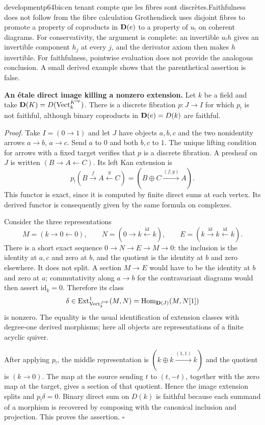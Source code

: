 \begin{dcomment}{development}{p64bis:en tenant compte que les fibres sont discrètes.}{Faithfulness does not follow from the fibre calculation}
Grothendieck uses disjoint fibres to promote a property of coproducts in $\mathbf{D}(e)$ to a property of $u_!$ on coherent diagrams. For conservativity, the argument is complete: an invertible $u_!h$ gives an invertible component $h_j$ at every $j$, and the derivator axiom then makes $h$ invertible. For faithfulness, pointwise evaluation does not provide the analogous conclusion. A small derived example shows that the parenthetical assertion is false.

\textbf{An étale direct image killing a nonzero extension.}\ours{}
Let $k$ be a field and take $\mathbf{D}(K)=D(\operatorname{Vect}_k^{K^{\mathrm{op}}})$. There is a discrete fibration $p:J\to I$ for which $p_!$ is not faithful, although binary coproducts in $\mathbf{D}(e)=D(k)$ are faithful.

\emph{Proof.} Take $I=(0\to1)$ and let $J$ have objects $a,b,c$ and the two nonidentity arrows $a\to b$, $a\to c$. Send $a$ to $0$ and both $b,c$ to $1$. The unique lifting condition for arrows with a fixed target verifies that $p$ is a discrete fibration. A presheaf on $J$ is written $(B\to A\leftarrow C)$. Its left Kan extension is
\[
       p_!(B\xrightarrow{f}A\xleftarrow{g}C)
       =(B\oplus C\xrightarrow{(f,g)}A).
\]
This functor is exact, since it is computed by finite direct sums at each vertex. Its derived functor is consequently given by the same formula on complexes.

Consider the three representations
\[
 M=(k\to0\leftarrow0),\qquad
 N=(0\to k\xleftarrow{\mathrm{id}}k),\qquad
 E=(k\xrightarrow{\mathrm{id}}k\xleftarrow{\mathrm{id}}k).
\]
There is a short exact sequence $0\to N\to E\to M\to0$: the inclusion is the identity at $a,c$ and zero at $b$, and the quotient is the identity at $b$ and zero elsewhere. It does not split. A section $M\to E$ would have to be the identity at $b$ and zero at $a$; commutativity along $a\to b$ for the contravariant diagrams would then assert $\mathrm{id}_k=0$. Therefore its class
\[
       \delta\in\operatorname{Ext}^1_{\operatorname{Vect}_k^{J^{\mathrm{op}}}}(M,N)
       =\operatorname{Hom}_{\mathbf{D}(J)}(M,N[1])
\]
is nonzero. The equality is the usual identification of extension classes with degree-one derived morphisms; here all objects are representations of a finite acyclic quiver.

After applying $p_!$, the middle representation is $(k\oplus k\xrightarrow{(1,1)}k)$ and the quotient is $(k\to0)$. The map at the source sending $t$ to $(t,-t)$, together with the zero map at the target, gives a section of that quotient. Hence the image extension splits and $p_!\delta=0$. Binary direct sum on $D(k)$ is faithful because each summand of a morphism is recovered by composing with the canonical inclusion and projection. This proves the assertion. \hfill$\square$


\end{dcomment}
